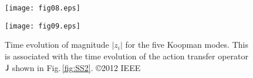 \documentclass[a4paper,10pt]{article}
\begin{document}
%
\begin{figure}[t] %
\centering
\texttt{[image: fig08.eps]}
\caption{%
Collective dynamics of the CSI phenomenon shown in Fig.\,\ref{fig:COA2}(b) and snapshots of the action transfer operator $\mathsf{J}$.  
The six snapshots are at time (1) 1.2\,s, (2) 2.8\,s, (3) 5.0\,s, (4) 7.2\,s, (5) 8.4\,s, and (6) 9.0\,s.
\copyright 2012 IEEE
}%
\label{fig:SS2}
\vspace*{4mm}
\texttt{[image: fig09.eps]}
\caption{%
Time evolution of magnitude $|z_i|$ for the five Koopman modes.  
This is associated with the time evolution of the action transfer operator ${\sf J}$ shown in Fig.\,\ref{fig:SS2}.
\copyright 2012 IEEE
}%
\label{fig:zi2}
\end{figure}
\end{document}
